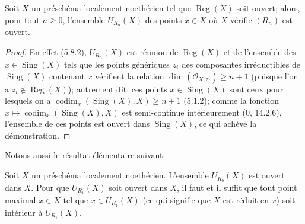 \begin{proposition}[6.12.9]
\label{IV.2.s6.12.9-fr}
Soit $X$ un préschéma localement noethérien tel que $\operatorname{Reg}(X)$
soit ouvert; alors, pour tout $n\geq0$, l'ensemble $U_{R_n}(X)$ des points
$x\in X$ où $X$ vérifie $(R_n)$ est ouvert.
\end{proposition}

\begin{proof}
En effet (5.8.2), $U_{R_n}(X)$ est réunion de $\operatorname{Reg}(X)$ et de
l'ensemble des $x\in\operatorname{Sing}(X)$ tels que les points génériques
$z_i$ des composantes irréductibles de $\operatorname{Sing}(X)$ contenant
$x$ vérifient la relation $\dim(\mathcal O_{X,z_i})\geq n+1$ (puisque l'on a
$z_i\notin\operatorname{Reg}(X)$); autrement dit, ces points
$x\in\operatorname{Sing}(X)$ sont ceux pour lesquels on a
$\operatorname{codim}_x(\operatorname{Sing}(X),X)\geq n+1$ (5.1.2); comme
la fonction $x\mapsto\operatorname{codim}_x(\operatorname{Sing}(X),X)$ est
semi-continue intérieurement (0, 14.2.6), l'ensemble de ces points est
ouvert dans $\operatorname{Sing}(X)$, ce qui achève la démonstration.
\end{proof}

Notons aussi le résultat élémentaire suivant:

\begin{proposition}[6.12.10]
\label{IV.2.s6.12.10-fr}
Soit $X$ un préschéma localement noethérien. L'ensemble $U_{R_0}(X)$ est
ouvert dans $X$. Pour que $U_{R_1}(X)$ soit ouvert dans $X$, il faut et il
suffit que tout point maximal $x\in X$ tel que $x\in U_{R_1}(X)$ (ce qui
signifie que $X$ est réduit en $x$) soit intérieur à $U_{R_1}(X)$.
\end{proposition}

